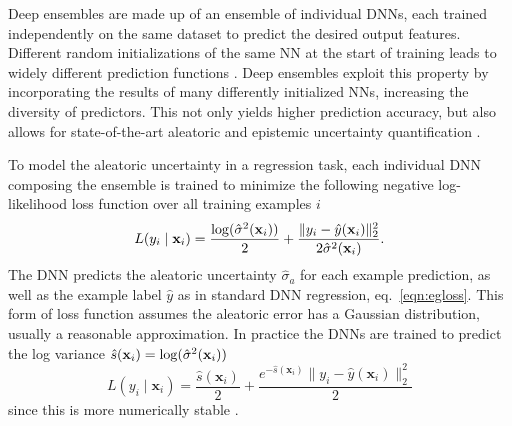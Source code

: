 Deep ensembles are made up of an ensemble of individual DNNs, each trained independently on the same dataset to predict the desired output features. Different random initializations of the same NN at the start of training leads to widely different prediction functions \citep{fort_deep_2019}. Deep ensembles exploit this property by incorporating the results of many differently initialized NNs, increasing the diversity of predictors. This not only yields higher prediction accuracy, but also allows for state-of-the-art aleatoric and epistemic uncertainty quantification \citep{ovadia_can_2019, gustafsson_evaluating_2020}.

To model the aleatoric uncertainty in a regression task, each individual DNN composing the ensemble is trained to minimize the following negative log-likelihood loss function over all training examples $i$ \citep{lakshminarayanan_simple_2017}
\begin{equation}
    L(y_i\mid\mathbf{x}_i) = \frac{{\rm log}(\hat{\sigma}^2(\mathbf{x}_i))}{2} + \frac{\|y_i - \hat{y}(\mathbf{x}_i)\|_2^2}{2\hat{\sigma}^2(\mathbf{x}_i)}.
\end{equation}
The DNN predicts the aleatoric uncertainty $\hat{\sigma}_a$ for each example prediction, as well as the example label $\hat{y}$ as in standard DNN regression, eq.~\ref{eqn:egloss}. This form of loss function assumes the aleatoric error has a Gaussian distribution, usually a reasonable approximation. In practice the DNNs are trained to predict the log variance $\hat{s}(\mathbf{x}_i) = {\rm log}(\hat{\sigma}^2(\mathbf{x}_i))$
\begin{equation}
\label{eqn:log_loss}
    L(y_i\mid\mathbf{x}_i) = \frac{\hat{s}(\mathbf{x}_i)}{2} + \frac{e^{-\hat{s}(\mathbf{x}_i)}\|y_i - \hat{y}(\mathbf{x}_i)\|_2^2}{2}
\end{equation}
since this is more numerically stable \citep{kendall_what_2017}.

